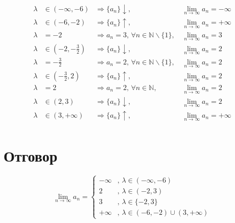 \documentclass{article}
\begin{document}
\begin{align*}
    \lambda &\in (-\infty, -6) &\Longrightarrow \{a_n\}\downarrow ,&\, \lim_{n \to \infty} a_n = -\infty \\
    \lambda &\in (-6, -2) &\Longrightarrow \{a_n\}\uparrow ,&\, \lim_{n \to \infty} a_n = +\infty \\
    \lambda &= -2 &\Longrightarrow a_n = 3,\, \forall n \in \mathbb{N}\backslash\{1\},&\, \lim_{n \to \infty} a_n = 3 \\
    \lambda &\in \left(-2, -\frac{3}{2}\right) &\Longrightarrow \{a_n\}\downarrow ,&\, \lim_{n \to \infty} a_n = 2 \\
    \lambda &= -\frac{3}{2} &\Longrightarrow a_n = 2,\, \forall n \in \mathbb{N}\backslash\{1\},&\, \lim_{n \to \infty} a_n = 2 \\
    \lambda &\in \left(-\frac{3}{2}, 2\right) &\Longrightarrow \{a_n\}\uparrow ,&\, \lim_{n \to \infty} a_n = 2 \\
    \lambda &= 2 &\Longrightarrow a_n = 2,\, \forall n \in \mathbb{N},&\, \lim_{n \to \infty} a_n = 2 \\
    \lambda &\in (2, 3) &\Longrightarrow \{a_n\}\downarrow ,&\, \lim_{n \to \infty} a_n = 2 \\
    \lambda &\in (3, +\infty) &\Longrightarrow \{a_n\}\uparrow ,&\, \lim_{n \to \infty} a_n = +\infty \\
\end{align*}

\section{Отговор}

\begin{equation}
    \lim_{n \to \infty} a_n =
    \begin{cases}
        -\infty &,\, \lambda \in (-\infty, -6) \\
        2       &,\, \lambda \in (-2, 3) \\
        3       &,\, \lambda \in \{-2, 3\} \\
        +\infty &,\, \lambda \in (-6, -2) \cup (3, +\infty)
    \end{cases}
\end{equation}
\end{document}
